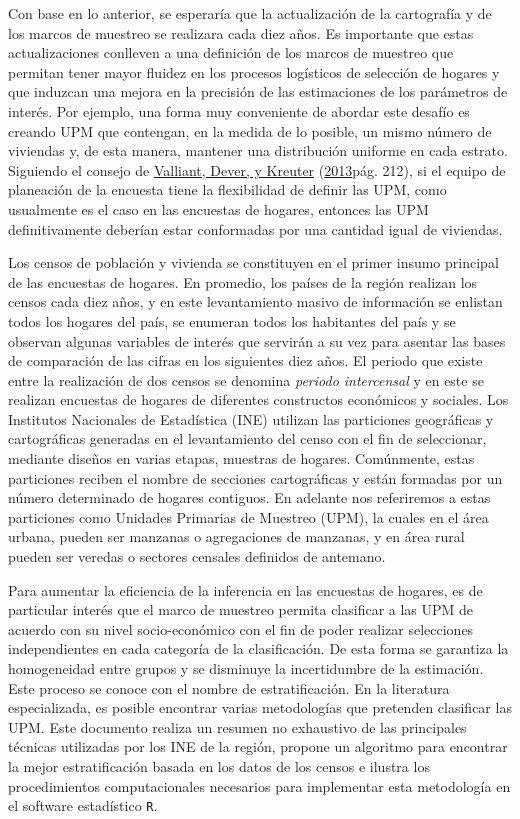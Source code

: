 \documentclass[
  12pt,
  spanish,
]{book}
\begin{document}
Con base en lo anterior, se esperaría que la actualización de la cartografía y de los marcos de muestreo se realizara cada diez años. Es importante que estas actualizaciones conlleven a una definición de los marcos de muestreo que permitan tener mayor fluidez en los procesos logísticos de selección de hogares y que induzcan una mejora en la precisión de las estimaciones de los parámetros de interés. Por ejemplo, una forma muy conveniente de abordar este desafío es creando UPM que contengan, en la medida de lo posible, un mismo número de viviendas y, de esta manera, mantener una distribución uniforme en cada estrato. Siguiendo el consejo de \protect\hyperlink{ref-Valliant_Dever_Kreuter_2013}{Valliant, Dever, y Kreuter} (\protect\hyperlink{ref-Valliant_Dever_Kreuter_2013}{2013}pág. 212), si el equipo de planeación de la encuesta tiene la flexibilidad de definir las UPM, como usualmente es el caso en las encuestas de hogares, entonces las UPM definitivamente deberían estar conformadas por una cantidad igual de viviendas.

Los censos de población y vivienda se constituyen en el primer insumo principal de las encuestas de hogares. En promedio, los países de la región realizan los censos cada diez años, y en este levantamiento masivo de información se enlistan todos los hogares del país, se enumeran todos los habitantes del país y se observan algunas variables de interés que servirán a su vez para asentar las bases de comparación de las cifras en los siguientes diez años. El periodo que existe entre la realización de dos censos se denomina \emph{periodo intercensal} y en este se realizan encuestas de hogares de diferentes constructos económicos y sociales. Los Institutos Nacionales de Estadística (INE) utilizan las particiones geográficas y cartográficas generadas en el levantamiento del censo con el fin de seleccionar, mediante diseños en varias etapas, muestras de hogares. Comúnmente, estas particiones reciben el nombre de secciones cartográficas y están formadas por un número determinado de hogares contiguos. En adelante nos referiremos a estas particiones como Unidades Primarias de Muestreo (UPM), la cuales en el área urbana, pueden ser manzanas o agregaciones de manzanas, y en área rural pueden ser veredas o sectores censales definidos de antemano.

Para aumentar la eficiencia de la inferencia en las encuestas de hogares, es de particular interés que el marco de muestreo permita clasificar a las UPM de acuerdo con su nivel socio-económico con el fin de poder realizar selecciones independientes en cada categoría de la clasificación. De esta forma se garantiza la homogeneidad entre grupos y se disminuye la incertidumbre de la estimación. Este proceso se conoce con el nombre de estratificación. En la literatura especializada, es posible encontrar varias metodologías que pretenden clasificar las UPM. Este documento realiza un resumen no exhaustivo de las principales técnicas utilizadas por los INE de la región, propone un algoritmo para encontrar la mejor estratificación basada en los datos de los censos e ilustra los procedimientos computacionales necesarios para implementar esta metodología en el software estadístico \texttt{R}.
\end{document}
